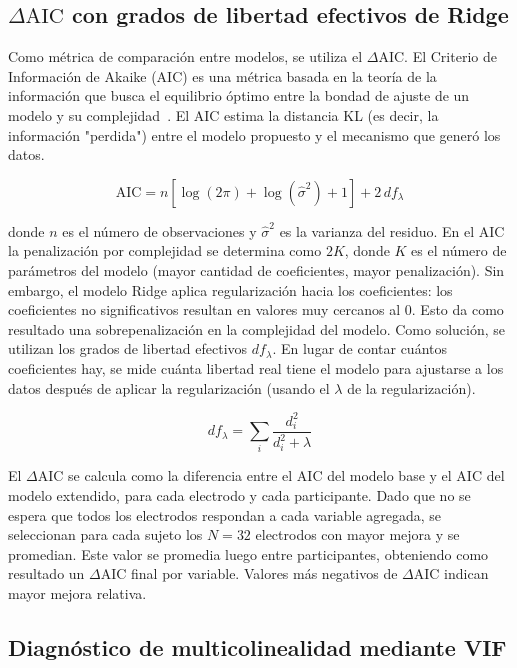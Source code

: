 \subsection{$\Delta\mathrm{AIC}$ con grados de libertad efectivos de Ridge}

Como métrica de comparación entre modelos, se utiliza el $\Delta$AIC. El Criterio de Información de Akaike (AIC) es una métrica basada en la teoría de la información que busca el equilibrio óptimo entre la bondad de ajuste de un modelo y su complejidad~\citep{akaike1974}. El AIC estima la distancia KL (es decir, la información "perdida") entre el modelo propuesto y el mecanismo que generó los datos.

\begin{equation}
    \label{eq:aic}
    \mathrm{AIC} = n\left[\log(2\pi) + \log(\hat{\sigma}^2) + 1\right] + 2\,df_\lambda
\end{equation}

\noindent donde $n$ es el número de observaciones y $\hat{\sigma}^2$ es la varianza del residuo. En el AIC la penalización por complejidad se determina como $2K$, donde $K$ es el número de parámetros del modelo (mayor cantidad de coeficientes, mayor penalización). Sin embargo, el modelo Ridge aplica regularización hacia los coeficientes: los coeficientes no significativos resultan en valores muy cercanos al 0. Esto da como resultado una sobrepenalización en la complejidad del modelo. Como solución, se utilizan los grados de libertad efectivos $df_{\lambda}$. En lugar de contar cuántos coeficientes hay, se mide cuánta libertad real tiene el modelo para ajustarse a los datos después de aplicar la regularización (usando el $\lambda$ de la regularización).

\begin{equation}
    \label{eq:df_lambda}
    df_{\lambda} = \sum_{i} \frac{d_i^2}{d_i^2 + \lambda}
\end{equation}

El $\Delta\mathrm{AIC}$ se calcula como la diferencia entre el AIC del modelo base y el AIC del modelo extendido, para cada electrodo y cada participante. Dado que no se espera que todos los electrodos respondan a cada variable agregada, se seleccionan para cada sujeto los $N = 32$ electrodos con mayor mejora y se promedian. Este valor se promedia luego entre participantes, obteniendo como resultado un $\Delta\mathrm{AIC}$ final por variable. Valores más negativos de $\Delta\mathrm{AIC}$ indican mayor mejora relativa.

\subsection{Diagnóstico de multicolinealidad mediante VIF}

